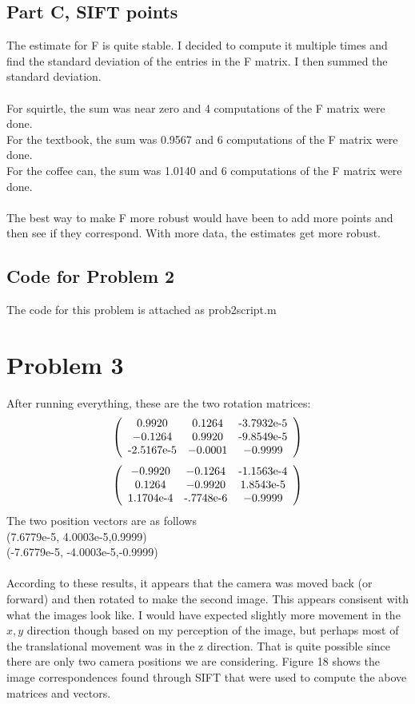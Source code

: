 \documentclass[11pt,psfig]{article}
\begin{document}
\newpage

\subsection*{Part C, SIFT points}

The estimate for F is quite stable. I decided to compute it multiple times and find the standard deviation of the entries in the F matrix. I then summed the standard deviation. \\
\\
For squirtle, the sum was near zero and 4 computations of the F matrix were done.\\
For the textbook, the sum was 0.9567 and 6 computations of the F matrix were done.\\
For the coffee can, the sum was 1.0140 and 6 computations of the F matrix were done. \\
\\
The best way to make F more robust would have been to add more points and then see if they correspond. With more data, the estimates get more robust. 

\subsection*{Code for Problem 2}

The code for this problem is attached as prob2script.m

\newpage

\section*{Problem 3}

After running everything, these are the two rotation matrices:
\[ \left( \begin{array}{ccc}
0.9920 & 0.1264 & $-3.7932e-5$\\
-0.1264 &  0.9920 & $-9.8549e-5$\\		
$-2.5167e-5$ & -0.0001 & -0.9999 \end{array} \right)\] 
\[ \left( \begin{array}{ccc}
-0.9920 & -0.1264 & $-1.1563e-4$\\
0.1264 &  -0.9920 & $1.8543e-5$\\		
$1.1704e-4$ & $-.7748e-6$ & -0.9999 \end{array} \right)\] 
The two position vectors are as follows\\
(7.6779e-5, 4.0003e-5,0.9999)
\\
(-7.6779e-5, -4.0003e-5,-0.9999)
\\
\\
According to these results, it appears that the camera was moved back (or forward) and then rotated to make the second image. This appears consisent with what the images look like. I would have expected slightly more movement in the $x,y$ direction though based on my perception of the image, but perhaps most of the translational movement was in the z direction. That is quite possible since there are only two camera positions we are considering. Figure 18 shows the image correspondences found through SIFT that were used to compute the above matrices and vectors.
\end{document}
